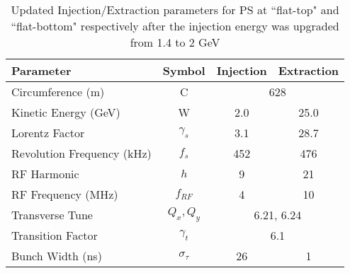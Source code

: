 \begin{table}
    \centering
    \begin{tabular}{lccc}
        Parameter                  & Symbol        & Injection                      & Extraction \\
        \hline
        Circumference (m)          & C             & \multicolumn{2}{c}{628}                     \\
        Kinetic Energy (GeV)       & W             & 2.0                            & 25.0        \\
        Lorentz Factor             & $\gamma_s$      & 3.1                            & 28.7       \\
        Revolution Frequency (kHz) & $f_s$         & 452                            & 476        \\
        RF Harmonic                & $h$           & 9                              & 21         \\
        RF Frequency (MHz)         & $f_{RF}$      & 4                              & 10         \\
        Transverse Tune            & $Q_x, Q_y$    & \multicolumn{2}{c}{6.21, 6.24}              \\
        Transition Factor          & $\gamma_t$    & \multicolumn{2}{c}{6.1}          \\
        Bunch Width (ns)           & $\sigma_\tau$ & 26                             & 1
    \end{tabular}
    \caption{Updated Injection/Extraction parameters for PS at ``flat-top" and ``flat-bottom" respectively after the injection energy was upgraded from 1.4 to 2 GeV}
    \label{tab:ps_parameters}
\end{table}